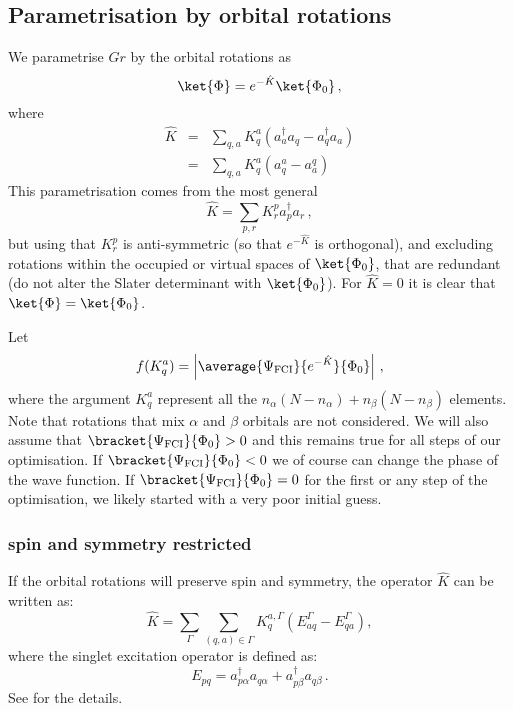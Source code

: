 \documentclass[a4paper,11pt]{article}
\newcommand{\irp}{\ensuremath{\Gamma}}
\begin{document}
\subsection{Parametrisation by orbital rotations}
We parametrise $Gr$ by the orbital rotations as\cite{}
\begin{equation}
  \ket{\Phi} = e^{-\hat{K}} \ket{\Phi_0}\,,
\end{equation}
where
\begin{eqnarray}
  \hat{K} &=& \sum_{q,a} K_q^a(a_a^\dagger a_q - a_q^\dagger a_a)\\
          &=& \sum_{q,a} K_q^a(a_q^a - a_a^q)\,
\end{eqnarray}
This parametrisation comes from the most general 
\begin{equation}
  \hat{K} = \sum_{p,r} K_r^pa_p^\dagger a_r\,,
\end{equation}
but using that $K_r^p$ is anti-symmetric (so that $e^{-\hat{K}}$ is orthogonal), and excluding rotations within the occupied or virtual spaces of $\ket{\Phi_0}$, that are redundant (do not alter the Slater determinant with $\ket{\Phi_0}$).
For $\hat{K} = 0$ it is clear that $\ket{\Phi} = \ket{\Phi_0}$.

Let
\begin{equation}
  f(K_q^a) = \left|\average{\Psi_\text{FCI}}{e^{-\hat{K}}}{\Phi_0}\right|\,,
\end{equation}
where the argument $K_q^a$ represent all the $n_\alpha(N-n_\alpha) + n_\beta(N-n_\beta)$ elements.
Note that rotations that mix $\alpha$ and $\beta$ orbitals are not considered.
We will also assume that $\bracket{\Psi_\text{FCI}}{\Phi_0} > 0$ and this remains true for all steps
of our optimisation.
If $\bracket{\Psi_\text{FCI}}{\Phi_0} < 0$ we of course can change the phase of the wave function.
If $\bracket{\Psi_\text{FCI}}{\Phi_0} = 0$ for the first or any step of the optimisation, we likely started with a very poor initial guess.

\subsubsection{spin and symmetry restricted}

If the orbital rotations will preserve spin and symmetry, the operator $\hat{K}$ can be written as:
\begin{equation}
  \hat{K} = \sum_\irp \sum_{(q,a) \in \irp} K_q^{a,\irp}(E_{aq}^\irp - E_{qa}^\irp),
\end{equation}
where the singlet excitation operator is defined as:
\begin{equation}
  E_{pq} = a_{p\alpha}^\dagger a_{q\alpha} + a_{p\beta}^\dagger a_{q\beta}\,.
\end{equation}
See \cite{helgaker00_molec} for the details.
\end{document}
